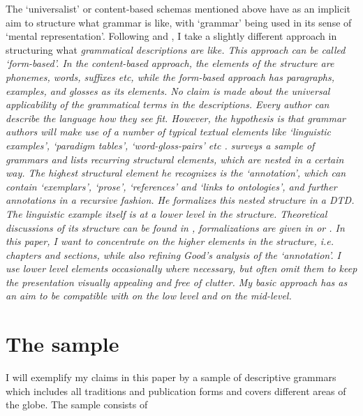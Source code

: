 The `universalist' or content-based schemas mentioned above have as an implicit aim to structure what grammar is like, with `grammar' being used in its sense of `mental representation'. Following \citet{Good2004} and \citet{Nordhoff2008jldc}, I take a slightly different approach in structuring what \em grammatical descriptions \em are like. This approach can be called `form-based'. In the content-based approach, the elements of the structure are phonemes, words,  suffixes etc, while the form-based approach has paragraphs, examples,  and glosses as its elements. No claim is made about the universal applicability of the grammatical terms in the descriptions. Every author can describe the language how they see fit. However, the hypothesis is that grammar authors will make use of a number of typical textual elements like `linguistic examples', `paradigm tables',  `word-gloss-pairs' etc \citep{Good2004}. \citet{Good2004} surveys a sample of grammars and lists recurring structural elements, which are nested in a certain way. The highest structural element he recognizes is the `annotation', which can contain `exemplars', `prose', `references' and `links to ontologies', and further annotations in a recursive fashion. He formalizes this nested structure in a DTD. The linguistic example itself is at a lower level in the structure. Theoretical discussions of its structure can be found in \citet{Drude2002},   formalizations are given in \citet{Peterson2002} or \citet{BowEtAl2003}. In this paper, I want to concentrate on the higher elements in the structure, i.e. chapters and sections, while also refining Good's analysis of the `annotation'. I use lower level elements occasionally where necessary, but often omit them to keep the presentation visually appealing and free of clutter. My basic approach has as an aim to be compatible with \citet{BowEtAl2003} on the low level and \citet{Good2004} on the mid-level.

\section{The sample}


I will exemplify my claims in this paper by a sample of descriptive grammars which includes all traditions and publication forms and covers different areas of the globe. The sample consists of

